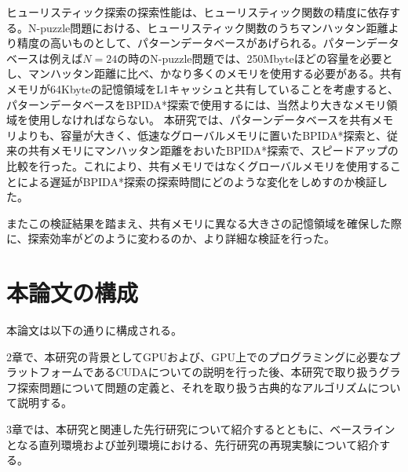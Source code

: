 \documentclass[a4paper,11pt,oneside,openany]{jsbook}
\begin{document}
ヒューリスティック探索の探索性能は、ヒューリスティック関数の精度に依存する。N-puzzle問題における、ヒューリスティック関数のうちマンハッタン距離より精度の高いものとして、パターンデータベースがあげられる。パターンデータベースは例えば$N=24$の時のN-puzzle問題では、250Mbyteほどの容量を必要とし、マンハッタン距離に比べ、かなり多くのメモリを使用する必要がある。共有メモリが64Kbyteの記憶領域をL1キャッシュと共有していることを考慮すると、パターンデータベースをBPIDA*探索で使用するには、当然より大きなメモリ領域を使用しなければならない。
本研究では、パターンデータベースを共有メモリよりも、容量が大きく、低速なグローバルメモリに置いたBPIDA*探索と、従来の共有メモリにマンハッタン距離をおいたBPIDA*探索で、スピードアップの比較を行った。これにより、共有メモリではなくグローバルメモリを使用することによる遅延がBPIDA*探索の探索時間にどのような変化をしめすのか検証した。

またこの検証結果を踏まえ、共有メモリに異なる大きさの記憶領域を確保した際に、探索効率がどのように変わるのか、より詳細な検証を行った。




\section{本論文の構成}
本論文は以下の通りに構成される。

2章で、本研究の背景としてGPUおよび、GPU上でのプログラミングに必要なプラットフォームであるCUDAについての説明を行った後、本研究で取り扱うグラフ探索問題について問題の定義と、それを取り扱う古典的なアルゴリズムについて説明する。

3章では、本研究と関連した先行研究について紹介するとともに、ベースラインとなる直列環境および並列環境における、先行研究の再現実験について紹介する。
\end{document}
